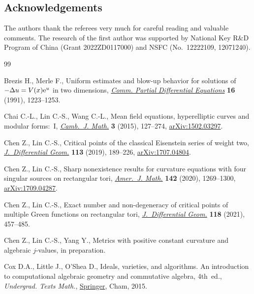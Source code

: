 \documentclass[10pt,a4paper]{amsart}
\numberwithin{equation}{section}
\begin{document}
\subsection*{Acknowledgements}

The authors thank the referees very much for careful reading and valuable comments. The research of the first author was supported by National Key R\&D Program of China (Grant 2022ZD0117000) and NSFC (No.~12222109, 12071240).


\begin{thebibliography}{99}
\footnotesize\itemsep=0pt

Brezis H., Merle F., Uniform estimates and blow-up behavior for solutions of
 {$-\Delta u=V(x){\rm e}^u$} in two dimensions, \href{https://doi.org/10.1080/03605309108820797}{\textit{Comm. Partial Differential
 Equations}} \textbf{16} (1991), 1223--1253.

Chai C.-L., Lin C.-S., Wang C.-L., Mean field equations, hyperelliptic curves and
 modular forms:~{I}, \href{https://doi.org/10.4310/CJM.2015.v3.n1.a3}{\textit{Camb.~J. Math.}} \textbf{3} (2015), 127--274,
 \href{https://arxiv.org/abs/1502.03297}{arXiv:1502.03297}.

Chen Z., Lin C.-S., Critical points of the classical {E}isenstein series of
 weight two, \href{https://doi.org/10.4310/jdg/1571882423}{\textit{J.~Differential Geom.}} \textbf{113} (2019), 189--226,
 \href{https://arxiv.org/abs/1707.04804}{arXiv:1707.04804}.

Chen Z., Lin C.-S., Sharp nonexistence results for curvature equations with four
 singular sources on rectangular tori, \href{https://doi.org/10.1353/ajm.2020.0028}{\textit{Amer.~J. Math.}} \textbf{142}
 (2020), 1269--1300, \href{https://arxiv.org/abs/1709.04287}{arXiv:1709.04287}.

Chen Z., Lin C.-S., Exact number and non-degeneracy of critical points of
 multiple {G}reen functions on rectangular tori, \href{https://doi.org/10.4310/jdg/1625860623}{\textit{J.~Differential
 Geom.}} \textbf{118} (2021), 457--485.

Chen Z., Lin C.-S., Yang Y., Metrics with positive constant curvature and
 algebraic $j$-values, {i}n preparation.

Cox D.A., Little J., O'Shea D., Ideals, varieties, and algorithms. {A}n
 introduction to computational algebraic geometry and commutative algebra, 4th~ed., \textit{Undergrad. Texts Math.}, \href{https://doi.org/10.1007/978-3-319-16721-3}{Springer}, Cham, 2015.


\end{thebibliography}
\end{document}

